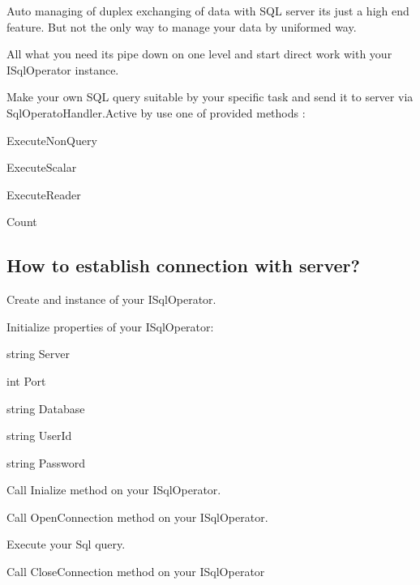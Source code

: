 Auto managing of duplex exchanging of data with S\+QL server it\textquotesingle{}s just a high end feature. But not the only way to manage your data by uniformed way.

All what you need it\textquotesingle{}s pipe down on one level and start direct work with your \textquotesingle{}I\+Sql\+Operator\textquotesingle{} instance.

Make your own S\+QL query suitable by your specific task and send it to server via \textquotesingle{}Sql\+Operato\+Handler.\+Active\textquotesingle{} by use one of provided methods \+:
\begin{DoxyItemize}
\item \textquotesingle{}Execute\+Non\+Query\textquotesingle{}
\item \textquotesingle{}Execute\+Scalar\textquotesingle{}
\item \textquotesingle{}Execute\+Reader\textquotesingle{}
\item \textquotesingle{}Count\textquotesingle{}
\end{DoxyItemize}

\subsection*{How to establish connection with server?}


\begin{DoxyEnumerate}
\item Create and instance of your \textquotesingle{}I\+Sql\+Operator\textquotesingle{}.
\item Initialize properties of your \textquotesingle{}I\+Sql\+Operator\textquotesingle{}\+:
\begin{DoxyItemize}
\item string Server
\item int Port
\item string Database
\item string User\+Id
\item string Password
\end{DoxyItemize}
\item Call \textquotesingle{}Inialize\textquotesingle{} method on your \textquotesingle{}I\+Sql\+Operator\textquotesingle{}.
\item Call \textquotesingle{}Open\+Connection\textquotesingle{} method on your \textquotesingle{}I\+Sql\+Operator\textquotesingle{}.
\item Execute your Sql query.
\item Call \textquotesingle{}Close\+Connection\textquotesingle{} method on your \textquotesingle{}I\+Sql\+Operator\textquotesingle{} 
\end{DoxyEnumerate}